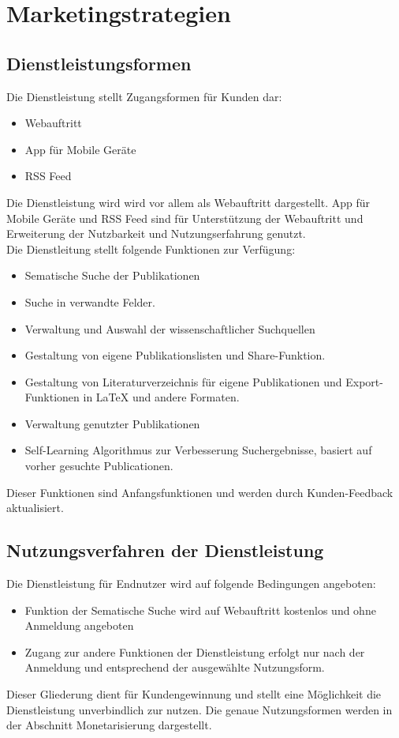 \section{Marketingstrategien}

\subsection{Dienstleistungsformen}

Die Dienstleistung stellt Zugangsformen für Kunden dar:
\begin{itemize}
\item Webauftritt
\item App für Mobile Geräte
\item RSS Feed
\end{itemize}

Die Dienstleistung wird wird vor allem als Webauftritt dargestellt. App für Mobile Geräte und RSS Feed sind für Unterstützung der Webauftritt und Erweiterung der Nutzbarkeit und Nutzungserfahrung genutzt.\\

Die Dienstleitung stellt folgende Funktionen zur Verfügung:
\begin{itemize}
\item Sematische Suche der Publikationen
\item Suche in verwandte Felder. 
\item Verwaltung und Auswahl der wissenschaftlicher Suchquellen
\item Gestaltung von eigene Publikationslisten und Share-Funktion.
\item Gestaltung von Literaturverzeichnis für eigene Publikationen und Export-Funktionen in {\LaTeX} und andere Formaten. 
\item Verwaltung genutzter Publikationen
\item Self-Learning Algorithmus zur Verbesserung Suchergebnisse, basiert auf vorher gesuchte Publicationen.
\end{itemize}

Dieser Funktionen sind Anfangsfunktionen und werden durch Kunden-Feedback aktualisiert. 

\subsection{Nutzungsverfahren der Dienstleistung}
Die Dienstleistung für Endnutzer wird auf folgende Bedingungen angeboten:
\begin{itemize}
\item Funktion der Sematische Suche wird auf Webauftritt kostenlos und ohne Anmeldung angeboten
\item Zugang zur andere Funktionen der Dienstleistung erfolgt nur nach der Anmeldung und entsprechend der ausgewählte Nutzungsform. 
\end{itemize}
Dieser Gliederung dient für Kundengewinnung und stellt eine Möglichkeit die Dienstleistung unverbindlich zur nutzen. Die genaue Nutzungsformen werden in der Abschnitt Monetarisierung dargestellt. 

